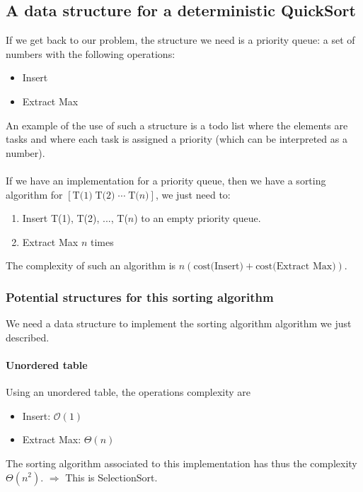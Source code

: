 \documentclass[11pt,a4paper]{article}
\begin{document}
\subsection*{A data structure for a deterministic QuickSort}

If we get back to our problem, the structure we need is a priority queue: a set of numbers with the following operations:
\begin{itemize}
\item Insert
\item Extract Max
\end{itemize}

An example of the use of such a structure is a todo list where the elements are tasks and where each task is assigned a priority (which can be interpreted as a number). 
\\ \\
If we have an implementation for a priority queue, then we have a sorting algorithm for $\left[ \text{T(1)} \; \text{T(2)} \; \cdots \; \text{T(}n\text{)} \right]$, we just need to:
\begin{enumerate} 
\item Insert T(1), T(2), ..., T($n$) to an empty priority queue.
\item Extract Max $n$ times
\end{enumerate}
The complexity of such an algorithm is $n \left( \text{cost(Insert)} + \text{cost(Extract Max)} \right)$.

\subsubsection*{Potential structures for this sorting algorithm}

We need a data structure to implement the sorting algorithm algorithm we just described. 

\paragraph*{Unordered table} Using an unordered table, the operations complexity are \begin{itemize}
\item Insert: $\mathcal{O}(1)$
\item Extract Max: $\Theta (n)$
\end{itemize}
The sorting algorithm associated to this implementation has thus the complexity $\Theta (n^2)$. \newline
$\Rightarrow$ This is SelectionSort.
\end{document}
